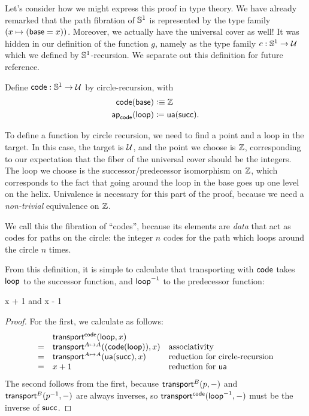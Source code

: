 Let's consider how we might express this proof in type theory.
We have already remarked that the path fibration of $\mathbb{S}^1$ is represented by the type family $(x\mapsto (\mathsf{base}=x))$.
Moreover, we actually have the universal cover as well!
It was hidden in our definition of the function $g$, namely as the type family $c:\mathbb{S}^1\to\mathcal{U}$ which we defined by $\mathbb{S}^1$-recursion.
We separate out this definition for future reference.

\begin{defn}
  Define $\mathsf{code} : \mathbb{S} ^1 \to \mathcal{U}$ by circle-recursion, with 
  \begin{align*}
    \mathsf{code}(\mathsf{base}) &\vcentcolon\equiv \mathbb{Z} \\
    \mathsf{ap}_{\mathsf{code}}({\mathsf{loop}}) &\coloneqq \mathsf{ua}(\mathsf{succ}).
  \end{align*}
\end{defn}

To define a function by circle recursion, we need to find a point and a
loop in the target.  In this case, the target is $\mathcal{U}$, and the point
we choose is $\mathbb{Z}$, corresponding to our expectation that the
fiber of the universal cover should be the integers.  The loop we choose
is the successor/predecessor isomorphism on $\mathbb{Z}$, which
corresponds to the fact that going around the loop in the base goes up
one level on the helix.  Univalence is necessary for this part of the
proof, because we need a \emph{non-trivial} equivalence on $\mathbb{Z}$.  

We call this the fibration of ``codes'', because its elements are \emph{data} that act as codes for paths on the circle: the integer $n$ codes for the path which loops around the circle $n$ times.

From this definition, it is simple to calculate that transporting with
$\mathsf{code}$ takes $\mathsf{loop}$ to the successor function, and 
$\mathord{{\mathsf{loop}}^{-1}}$ to the predecessor function:
\begin{lem} \label{lem:transport-s1-code}
 {x + 1} and 
 {x - 1}
\end{lem}
\begin{proof}
For the first, we calculate as follows:
\[
\begin{array}{lll}
 & {\mathsf{transport}^{\mathsf{code}}(\mathsf{loop},x)} &\\
= & \mathsf{transport}^{A \mapsto A}(({\mathsf{code}}({\mathsf{loop}})),x) & \text{associativity}\\
= & \mathsf{transport}^{A \mapsto A}(\mathsf{ua} (\mathsf{succ}),x) & \text{reduction for circle-recursion}\\
= & x + 1 & \text{reduction for \ensuremath{\mathsf{ua}}}
\end{array}
\]
The second follows from the first, because $\mathsf{transport}^{B}(p,-)$  and ${\mathsf{transport}^{B}(\mathord{{p}^{-1}},-)}$ are always inverses, so ${\mathsf{transport}^{\mathsf{code}}(\mathord{{\mathsf{loop}}^{-1}},-)}$ must be the inverse of $\mathsf{succ}$.
\end{proof}

